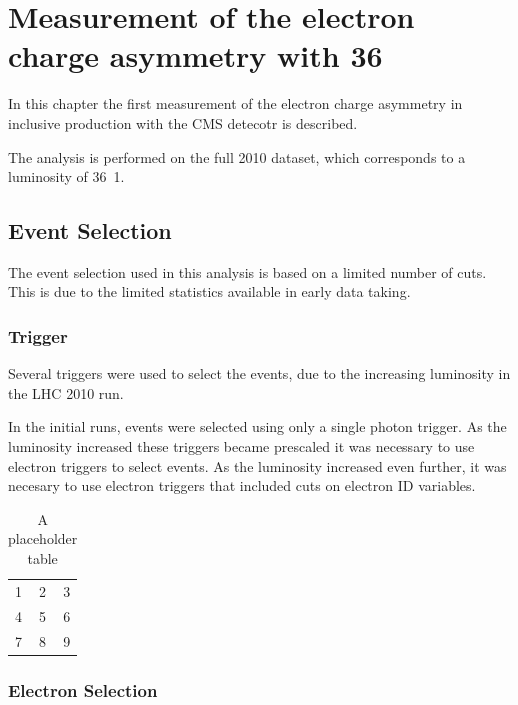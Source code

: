 \chapter{ 
Measurement of the electron charge asymmetry with \unit{36}{\invpb} }


In this chapter the first measurement of the electron charge asymmetry in
inclusive \inclusiveWe production with the CMS detecotr is described.

The analysis is performed on the full 2010 dataset, which corresponds to a
luminosity of \unit{36.1}{\invpb}.


\section{Event Selection}

The event selection used in this analysis is based on a limited number of cuts.
This is due to the limited statistics available in early data taking.

\subsection{Trigger}

Several triggers were used to select the events, due to the increasing
luminosity in the LHC 2010 run.

In the initial runs, events were selected using only a single photon trigger. 
As the luminosity increased these triggers became prescaled it was
necessary to use electron triggers to select events. 
As the luminosity increased even further, it was necesary to use electron
triggers that included cuts on electron ID variables.

\begin{table}[htb]
  \caption{A placeholder table}
  \label{asym36:triggers}
  \centering
  \begin{tabular}{| l c r |}
    \hline
    1 & 2 & 3 \\
    4 & 5 & 6 \\
    7 & 8 & 9 \\
  \hline
  \end{tabular}
\end{table}

\subsection{Electron Selection}

